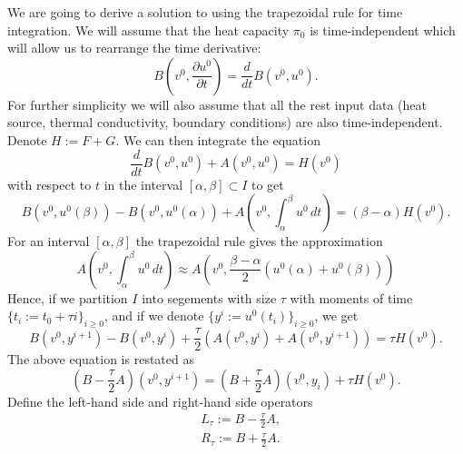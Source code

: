 \begin{discussion}
  \label{idec/heat_transport/discrete/primal_weak_transient_solve_trapezoidal-discussion}
  We are going to derive a solution to
  using the trapezoidal rule for time integration.
  We will assume that the heat capacity $\pi_0$ is time-independent which will
  allow us to rearrange the time derivative:
  \begin{equation}
    B(v^0, \frac{\partial u^0} {\partial t}) = \frac{d}{d t} B(v^0, u^0).
  \end{equation}
  For further simplicity we will also assume that all the rest input data (heat
  source, thermal conductivity, boundary conditions) are also time-independent.
  Denote $H := F + G$. We can then integrate the equation
  \begin{equation}
    \frac{d}{d t} B(v^0, u^0) + A(v^0, u^0) = H(v^0)
  \end{equation}
  with respect to $t$ in the interval $[\alpha, \beta] \subset I$ to get
  \begin{equation}
    B(v^0, u^0(\beta)) - B(v^0, u^0(\alpha))
    + A(v^0, \int_\alpha^\beta u^0\, d t)
    = (\beta - \alpha) H(v^0).
  \end{equation}
  For an interval $[\alpha, \beta]$ the trapezoidal rule gives the approximation
  \begin{equation}
    A(v^0, \int_\alpha^\beta u^0\, d t)
    \approx A(v^0, \frac{\beta - \alpha}{2} (u^0(\alpha) + u^0(\beta)))
  \end{equation}
  Hence, if we partition $I$ into segements with size $\tau$ with moments of
  time $\{t_i := t_0 + \tau i\}_{i \geq 0}$, and if we denote
  $\{y^i := u^0(t_i)\}_{i \geq 0}$, we get
  \begin{equation}
    B(v^0, y^{i + 1}) - B(v^0, y^i)
    + \frac{\tau}{2} (A(v^0, y^i) + A(v^0, y^{i + 1}))
    = \tau H(v^0).
  \end{equation}
  The above equation is restated as
  \begin{equation}
    (B - \frac{\tau}{2} A)(v^0, y^{i + 1})
    = (B + \frac{\tau}{2} A)(v^0, y_i) + \tau H(v^0).
  \end{equation}
  Define the left-hand side and right-hand side operators
  \begin{subequations}
    \begin{alignat}{1}
      & L_\tau := B - \frac{\tau}{2} A, \\
      & R_\tau := B + \frac{\tau}{2} A.
    \end{alignat}

\end{subequations}
\end{discussion}
